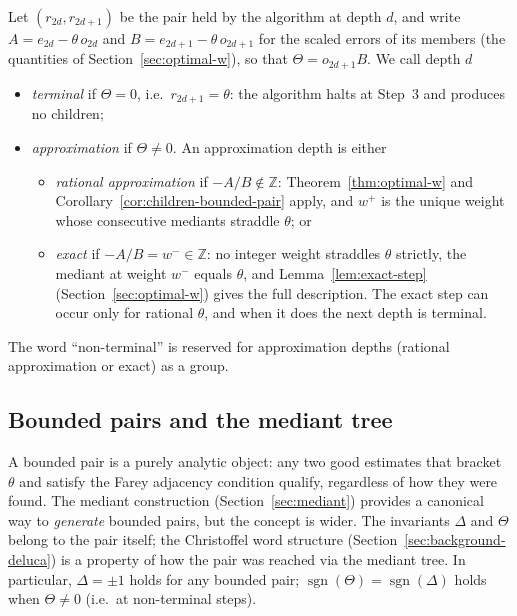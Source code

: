 \documentclass[12pt]{article}
\theoremstyle{definition}
\theoremstyle{remark}
\theoremstyle{plain}
\newcommand{\Kval}{\Theta}
\newcommand{\Dval}{\Delta}
\newcommand{\wplus}{w^{+}}
\newcommand{\wminus}{w^{-}}
\begin{document}
Let $(r_{2d}, r_{2d+1})$ be the pair held by the algorithm at depth $d$, and write
$A = e_{2d} - \theta\,o_{2d}$ and $B = e_{2d+1} - \theta\,o_{2d+1}$ for the scaled
errors of its members (the quantities of Section~\ref{sec:optimal-w}), so that
$\Kval = o_{2d+1}B$.
We call depth $d$
\begin{itemize}
  \item \emph{terminal} if $\Kval = 0$, i.e.\ $r_{2d+1} = \theta$: the algorithm halts
        at Step~3 and produces no children;
  \item \emph{approximation} if $\Kval \neq 0$.  An approximation depth is either
  \begin{itemize}
    \item \emph{rational approximation} if $-A/B \notin \mathbb{Z}$:
          Theorem~\ref{thm:optimal-w} and
          Corollary~\ref{cor:children-bounded-pair} apply, and $\wplus$ is the unique weight
          whose consecutive mediants straddle $\theta$; or
    \item \emph{exact} if $-A/B = \wminus \in \mathbb{Z}$: no integer weight straddles
          $\theta$ strictly, the mediant at weight $\wminus$ equals $\theta$, and
          Lemma~\ref{lem:exact-step} (Section~\ref{sec:optimal-w}) gives the full
          description.  The exact step can occur only for rational $\theta$, and when
          it does the next depth is terminal.
  \end{itemize}
\end{itemize}
The word ``non-terminal'' is reserved for approximation depths (rational approximation or exact) as a group.

\subsection*{Bounded pairs and the mediant tree}

A bounded pair is a purely analytic object: any two good estimates that bracket $\theta$
and satisfy the Farey adjacency condition qualify, regardless of how they were found.
The mediant construction (Section~\ref{sec:mediant}) provides a canonical way to
\emph{generate} bounded pairs, but the concept is wider.
The invariants $\Dval$ and $\Kval$ belong to the pair itself; the Christoffel word
structure (Section~\ref{sec:background-deluca}) is a property of how the pair was reached via
the mediant tree.
In particular, $\Dval = \pm 1$ holds for any bounded pair;
$\operatorname{sgn}(\Kval) = \operatorname{sgn}(\Dval)$ holds when $\Kval \neq 0$
(i.e.\ at non-terminal steps).
\end{document}
